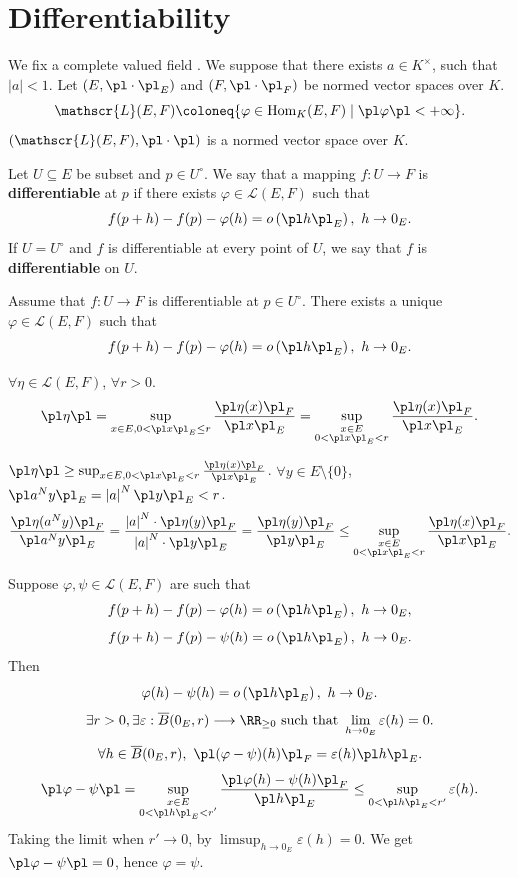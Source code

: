 \section{Differentiability}
We fix a complete valued field . We suppose that there exists $a\in K^\times$, such that $\left|a\right|<1$. Let $(E, \pl \cdot\pl_E)$ and $(F,\pl \cdot\pl_F)$ be normed vector spaces over $K$.
$$\mathscr{L}(E,F)\coloneq\{\varphi\in\mathrm{Hom}_{K}(E,F)\mid \pl\varphi\pl<+\infty\}.$$
$(\mathscr{L}(E,F),\pl \cdot\pl) $ is a normed vector space over $K$.
\begin{definitionenv}
    Let $U\subseteq E$ be subset and $p\in U^\circ$. We say that a mapping $f:U\longrightarrow F$ is \textbf{differentiable} at $p$ if there exists $\varphi\in\mathscr{L}(E,F)$ such that 
    $$f(p+h)-f(p)-\varphi(h)=o\left(\pl h\pl_E\right),\ h\rightarrow0_E.$$
    If $U=U^\circ$ and $f$ is differentiable at every point of $U$, we say that $f$ is \textbf{differentiable} on $U$.
\end{definitionenv}
\begin{propositionenv}
    Assume that $f:U\longrightarrow F$ is differentiable at $p\in U^\circ$. There exists a unique $\varphi\in \mathscr{L}(E,F)$ such that
    $$f(p+h)-f(p)-\varphi(h)=o\left(\pl h\pl_E\right),\ h\rightarrow 0_E.$$
\end{propositionenv}
\begin{lemmaenv}
    $\forall \eta\in \mathscr{L}(E,F)$, $\forall r>0$. 
    $$\pl\eta\pl=\sup_{x\in E,0<\pl x\pl_E\le r}\frac{\pl\eta(x)\pl_F}{\pl x\pl_E}=\sup_{\substack{x\in E\\0<\pl x\pl_E< r}}\frac{\pl\eta(x)\pl_F}{\pl x\pl_E}.$$
\end{lemmaenv}
\begin{proofenv}[of Lemma]
    $\pl\eta\pl\ge \sup_{x\in E,0<\pl x\pl_E< r}\frac{\pl\eta(x)\pl_F}{\pl x\pl_E}$. $\forall y\in E\setminus\{0\}$, $\pl a^N y\pl_{E}=\left|a\right|^N\pl y\pl_E<r$.
    $$\frac{\pl \eta(a^N y)\pl_F}{\pl a^N y\pl_E}=\frac{\left|a\right|^N\cdot\pl \eta(y)\pl_F}{\left|a\right|^N\cdot\pl y\pl_E}=\frac{\pl \eta(y)\pl_F}{\pl y\pl_E}\le \sup_{\substack{x\in E\\0<\pl x\pl_E< r}}\frac{\pl\eta(x)\pl_F}{\pl x\pl_E}.$$
\end{proofenv}
\begin{proofenv}[of Proposition]
    Suppose $\varphi,\psi\in\mathscr{L}(E,F)$ are such that
    $$f(p+h)-f(p)-\varphi(h)=o\left(\pl h\pl_E\right),\ h\rightarrow 0_E,$$
    $$f(p+h)-f(p)-\psi(h)=o\left(\pl h\pl_E\right),\ h\rightarrow 0_E.$$
    Then
    $$\varphi(h)-\psi(h)=o\left(\pl h\pl_E\right),\ h\rightarrow 0_E.$$
    $$\exists r>0, \exists\varepsilon:\overline{B}(0_E,r)\longrightarrow \RR_{\ge0}\text{ such that }\lim_{h\rightarrow 0_E}\varepsilon(h)=0.$$
    $$\forall h\in \overline{B}(0_E,r),\ \pl (\varphi-\psi)(h)\pl_F = \varepsilon(h)\pl h\pl_E.$$
    $$\pl \varphi-\psi\pl=\sup_{\substack{x\in E\\0<\pl h\pl_E< r'}}\frac{\pl\varphi(h)-\psi(h)\pl_F}{\pl h\pl_E}\le\sup_{0<\pl h\pl_E<r'}\varepsilon(h).$$
    Taking the limit when $r'\rightarrow 0$, by $\limsup_{h\rightarrow 0_E}\varepsilon(h)=0$. We get $\pl \varphi-\psi\pl=0$, hence $\varphi=\psi$.
\end{proofenv}
